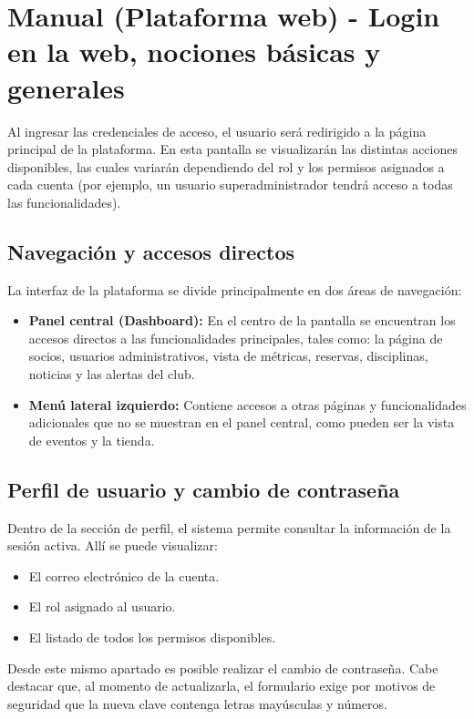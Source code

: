 \section{Manual (Plataforma web) - Login en la web, nociones básicas y generales}

Al ingresar las credenciales de acceso, el usuario será redirigido a la página principal de la plataforma. En esta pantalla se visualizarán las distintas acciones disponibles, las cuales variarán dependiendo del rol y los permisos asignados a cada cuenta (por ejemplo, un usuario superadministrador tendrá acceso a todas las funcionalidades).

\subsection{Navegación y accesos directos}
La interfaz de la plataforma se divide principalmente en dos áreas de navegación:

\begin{itemize}
    \item \textbf{Panel central (Dashboard):} En el centro de la pantalla se encuentran los accesos directos a las funcionalidades principales, tales como: la página de socios, usuarios administrativos, vista de métricas, reservas, disciplinas, noticias y las alertas del club.
    \item \textbf{Menú lateral izquierdo:} Contiene accesos a otras páginas y funcionalidades adicionales que no se muestran en el panel central, como pueden ser la vista de eventos y la tienda.
\end{itemize}

\subsection{Perfil de usuario y cambio de contraseña}
Dentro de la sección de perfil, el sistema permite consultar la información de la sesión activa. Allí se puede visualizar:

\begin{itemize}
    \item El correo electrónico de la cuenta.
    \item El rol asignado al usuario.
    \item El listado de todos los permisos disponibles.
\end{itemize}

Desde este mismo apartado es posible realizar el cambio de contraseña. Cabe destacar que, al momento de actualizarla, el formulario exige por motivos de seguridad que la nueva clave contenga letras mayúsculas y números.
